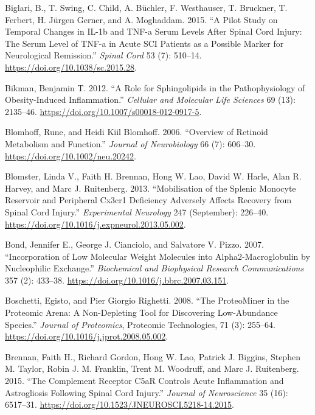 \documentclass[9pt,lineno]{elife}
\newlength{\cslhangindent}
\newlength{\cslentryspacingunit} %
\newenvironment{CSLReferences}[2] %
 {%
  \setlength{\parindent}{0pt}
  \ifodd #1
  \let\oldpar\par
  \def\par{\hangindent=\cslhangindent\oldpar}
  \fi
  \setlength{\parskip}{#2\cslentryspacingunit}
 }%
 {}
\begin{document}
\begin{landscape}
\begin{landscape}
\begin{landscape}
\begin{landscape}
\begin{CSLReferences}{1}{0}
\leavevmode{}%
Biglari, B., T. Swing, C. Child, A. Büchler, F. Westhauser, T. Bruckner, T. Ferbert, H. Jürgen Gerner, and A. Moghaddam. 2015. {``A Pilot Study on Temporal Changes in {IL-1b} and {TNF-a} Serum Levels After Spinal Cord Injury: The Serum Level of {TNF-a} in Acute {SCI} Patients as a Possible Marker for Neurological Remission.''} \emph{Spinal Cord} 53 (7): 510--14. \url{https://doi.org/10.1038/sc.2015.28}.

\leavevmode{}%
Bikman, Benjamin T. 2012. {``A Role for Sphingolipids in the Pathophysiology of Obesity-Induced Inflammation.''} \emph{Cellular and Molecular Life Sciences} 69 (13): 2135--46. \url{https://doi.org/10.1007/s00018-012-0917-5}.

\leavevmode{}%
Blomhoff, Rune, and Heidi Kiil Blomhoff. 2006. {``Overview of Retinoid Metabolism and Function.''} \emph{Journal of Neurobiology} 66 (7): 606--30. \url{https://doi.org/10.1002/neu.20242}.

\leavevmode{}%
Blomster, Linda V., Faith H. Brennan, Hong W. Lao, David W. Harle, Alan R. Harvey, and Marc J. Ruitenberg. 2013. {``Mobilisation of the Splenic Monocyte Reservoir and Peripheral {Cx3cr1} Deficiency Adversely Affects Recovery from Spinal Cord Injury.''} \emph{Experimental Neurology} 247 (September): 226--40. \url{https://doi.org/10.1016/j.expneurol.2013.05.002}.

\leavevmode{}%
Bond, Jennifer E., George J. Cianciolo, and Salvatore V. Pizzo. 2007. {``Incorporation of Low Molecular Weight Molecules into Alpha2-{Macroglobulin} by Nucleophilic Exchange.''} \emph{Biochemical and Biophysical Research Communications} 357 (2): 433--38. \url{https://doi.org/10.1016/j.bbrc.2007.03.151}.

\leavevmode{}%
Boschetti, Egisto, and Pier Giorgio Righetti. 2008. {``The {ProteoMiner} in the Proteomic Arena: {A} Non-Depleting Tool for Discovering Low-Abundance Species.''} \emph{Journal of Proteomics}, Proteomic {Technologies}, 71 (3): 255--64. \url{https://doi.org/10.1016/j.jprot.2008.05.002}.

\leavevmode{}%
Brennan, Faith H., Richard Gordon, Hong W. Lao, Patrick J. Biggins, Stephen M. Taylor, Robin J. M. Franklin, Trent M. Woodruff, and Marc J. Ruitenberg. 2015. {``The {Complement Receptor C5aR Controls Acute Inflammation} and {Astrogliosis} Following {Spinal Cord Injury}.''} \emph{Journal of Neuroscience} 35 (16): 6517--31. \url{https://doi.org/10.1523/JNEUROSCI.5218-14.2015}.


\end{CSLReferences}
\end{landscape}
\end{landscape}
\end{landscape}
\end{landscape}
\end{document}
